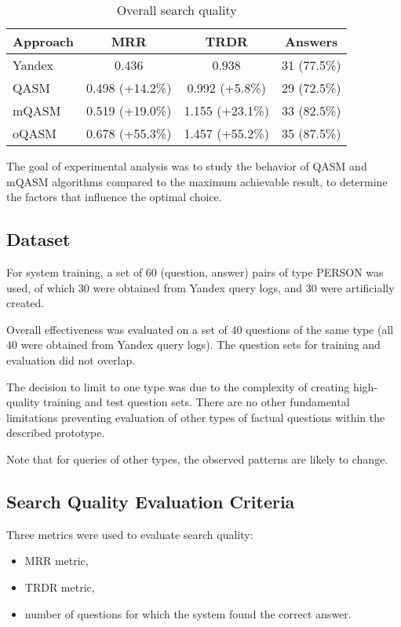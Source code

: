 \documentclass{article}
\begin{document}
\begin{table*}[tb]
\begin{center}
\begin{tabular}{|l|c|c|c|}
\hline
Approach & MRR & TRDR & Answers \\
\hline
\hline
Yandex & 0.436 & 0.938 & 31 (77.5\%) \\
\hline


QASM &  0.498 (+14.2\%) & 0.992 (+5.8\%) & 29 (72.5\%) \\
mQASM & 0.519 (+19.0\%) & 1.155 (+23.1\%) & 33 (82.5\%)  \\
\hline
oQASM & 0.678 (+55.3\%) & 1.457 (+55.2\%) & 35 (87.5\%) \\
\hline
\end{tabular}
\caption{Overall search quality}
\label{table:efficiency}
\end{center}
\end{table*}

The goal of experimental analysis was to study the behavior of QASM and mQASM algorithms
compared to the maximum achievable result,
to determine the factors that influence the optimal choice.

\subsection{Dataset}
For system training, a set of 60 (question, answer) pairs of type PERSON was used,
of which 30 were obtained from Yandex query logs,
and 30 were artificially created.

Overall effectiveness was evaluated on a set of 40 questions of the same type
(all 40 were obtained from Yandex query logs).
The question sets for training and evaluation did not overlap.

The decision to limit to one type was due to the complexity of creating
high-quality training and test question sets.
There are no other fundamental limitations preventing evaluation of other types
of factual questions within the described prototype.

Note that for queries of other types,
the observed patterns are likely to change.

\subsection{Search Quality Evaluation Criteria}
Three metrics were used to evaluate search quality:
\begin{itemize}
\item MRR metric,
\item TRDR metric,
\item number of questions for which the system found the correct answer.
\end{itemize}
\end{document}
